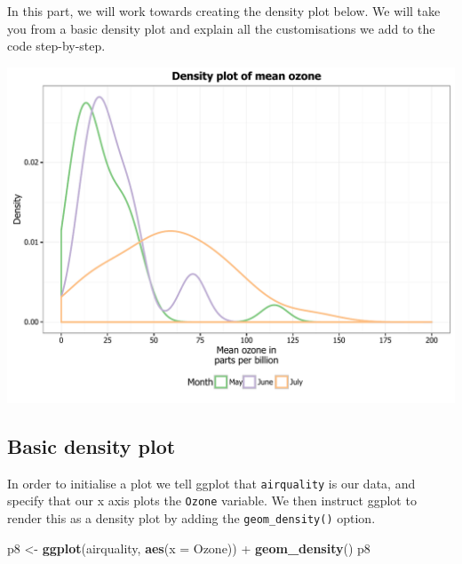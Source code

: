\documentclass[]{article}
\newenvironment{Shaded}{\begin{snugshade}}{\end{snugshade}}
\newcommand{\KeywordTok}[1]{\textcolor[rgb]{0.13,0.29,0.53}{\textbf{{#1}}}}
\newcommand{\DataTypeTok}[1]{\textcolor[rgb]{0.13,0.29,0.53}{{#1}}}
\newcommand{\StringTok}[1]{\textcolor[rgb]{0.31,0.60,0.02}{{#1}}}
\newcommand{\NormalTok}[1]{{#1}}
\begin{document}
In this part, we will work towards creating the density plot below. We
will take you from a basic density plot and explain all the
customisations we add to the code step-by-step.

\begin{center}\includegraphics{0_all_posts_pdf/density_final-1} \end{center}

\subsection{Basic density plot}\label{basic-density-plot}

In order to initialise a plot we tell ggplot that \texttt{airquality} is
our data, and specify that our x axis plots the \texttt{Ozone} variable.
We then instruct ggplot to render this as a density plot by adding the
\texttt{geom\_density()} option.

\begin{Shaded}
\begin{Highlighting}[]
\NormalTok{p8 <-}\StringTok{ }\KeywordTok{ggplot}\NormalTok{(airquality, }\KeywordTok{aes}\NormalTok{(}\DataTypeTok{x =} \NormalTok{Ozone)) +}\StringTok{ }\KeywordTok{geom_density}\NormalTok{()}
\NormalTok{p8}
\end{Highlighting}
\end{Shaded}
\end{document}
